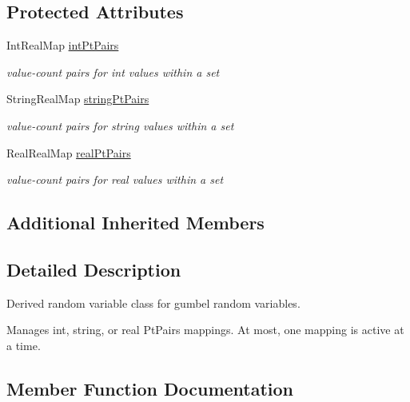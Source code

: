 \subsection*{Protected Attributes}
\begin{DoxyCompactItemize}
\item 
Int\+Real\+Map \hyperlink{classPecos_1_1HistogramPtRandomVariable_a4afce36f1a2de9cce17826ef449e95c6}{int\+Pt\+Pairs}\label{classPecos_1_1HistogramPtRandomVariable_a4afce36f1a2de9cce17826ef449e95c6}

\begin{DoxyCompactList}\small\item\em value-\/count pairs for int values within a set \end{DoxyCompactList}\item 
String\+Real\+Map \hyperlink{classPecos_1_1HistogramPtRandomVariable_ab1d97d07788ca5e5165c9f71e039f3b2}{string\+Pt\+Pairs}\label{classPecos_1_1HistogramPtRandomVariable_ab1d97d07788ca5e5165c9f71e039f3b2}

\begin{DoxyCompactList}\small\item\em value-\/count pairs for string values within a set \end{DoxyCompactList}\item 
Real\+Real\+Map \hyperlink{classPecos_1_1HistogramPtRandomVariable_a47c07f1236f6b38f8efe9cf2821ddfdc}{real\+Pt\+Pairs}\label{classPecos_1_1HistogramPtRandomVariable_a47c07f1236f6b38f8efe9cf2821ddfdc}

\begin{DoxyCompactList}\small\item\em value-\/count pairs for real values within a set \end{DoxyCompactList}\end{DoxyCompactItemize}
\subsection*{Additional Inherited Members}


\subsection{Detailed Description}
Derived random variable class for gumbel random variables. 

Manages int, string, or real Pt\+Pairs mappings. At most, one mapping is active at a time. 

\subsection{Member Function Documentation}
